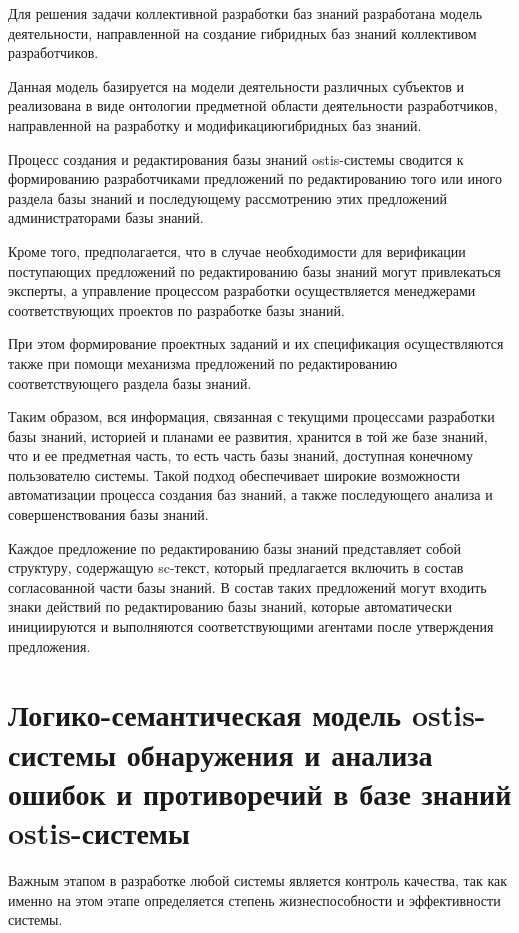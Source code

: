 Для решения задачи коллективной разработки баз знаний разработана модель деятельности, направленной на создание гибридных баз знаний коллективом разработчиков.

Данная модель базируется на модели деятельности различных субъектов и реализована в виде онтологии предметной области деятельности разработчиков, направленной на разработку и модификациюгибридных баз знаний.

Процесс создания и редактирования базы знаний ostis-системы сводится к формированию разработчиками предложений по редактированию того или иного раздела базы знаний и последующему рассмотрению этих предложений администраторами базы знаний.

Кроме того, предполагается, что в случае необходимости для верификации поступающих предложений по редактированию базы знаний могут привлекаться эксперты, а управление процессом разработки осуществляется менеджерами соответствующих проектов по разработке базы знаний.

При этом формирование проектных заданий и их спецификация осуществляются также при помощи механизма предложений по редактированию соответствующего раздела базы знаний. 

Таким образом, вся информация, связанная с текущими процессами разработки базы знаний, историей и планами ее развития, хранится в той же базе знаний, что и ее предметная часть, то есть часть базы знаний, доступная конечному пользователю системы. Такой подход обеспечивает широкие возможности автоматизации процесса создания баз знаний, а также последующего анализа и совершенствования базы знаний.

Каждое предложение по редактированию базы знаний представляет собой структуру, содержащую sc-текст, который предлагается включить в состав согласованной части базы знаний. В состав таких предложений могут входить знаки действий по редактированию базы знаний, которые автоматически инициируются и выполняются соответствующими агентами после утверждения предложения.


\section{Логико-семантическая модель ostis-системы обнаружения и анализа ошибок и противоречий в базе знаний ostis-системы}
\label{sec_kb_design_contradiction}

Важным этапом в разработке любой системы является контроль качества, так как именно на этом этапе определяется степень жизнеспособности и эффективности системы.


